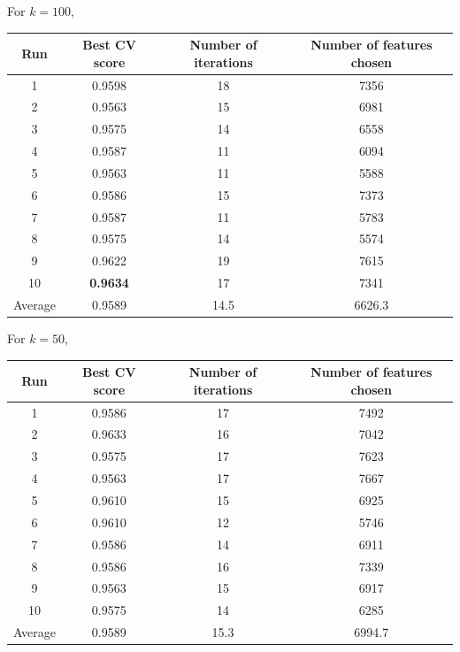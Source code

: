 \documentclass[12pt, twoside, a4paper]{report}
\begin{document}
For $k=100$,
\begin{center}
    \begin{tabular}{| c | c | c | c | } \hline
    Run & Best CV score & Number of iterations & Number of features chosen \\ \hline \hline
    1 & 0.9598 & 18 & 7356 \\ \hline
	2 & 0.9563  & 15 & 6981 \\ \hline
	3 & 0.9575 & 14 & 6558 \\ \hline
	4 & 0.9587 & 11 & 6094 \\ \hline
	5 & 0.9563 & 11 & 5588 \\ \hline
	6 & 0.9586 & 15 & 7373 \\ \hline
	7 & 0.9587 & 11 & 5783 \\ \hline
	8 & 0.9575 & 14 & 5574 \\ \hline
	9 & 0.9622 & 19 & 7615 \\ \hline
	10 & \textbf{0.9634} & 17 & 7341 \\ \hline
	Average & 0.9589 & 14.5 & 6626.3 \\ \hline
    \end{tabular}
\end{center}


For $k=50$,
\begin{center}
    \begin{tabular}{| c | c | c | c | } \hline
    Run & Best CV score & Number of iterations & Number of features chosen \\ \hline \hline
    1 & 0.9586 & 17 & 7492 \\ \hline
	2 & 0.9633 & 16 & 7042 \\ \hline
	3 & 0.9575 & 17 & 7623 \\ \hline
	4 & 0.9563 & 17 & 7667 \\ \hline
	5 & 0.9610 & 15 & 6925 \\ \hline
	6 & 0.9610 & 12 & 5746 \\ \hline
	7 & 0.9586 & 14 & 6911 \\ \hline
	8 & 0.9586 & 16 & 7339 \\ \hline
	9 & 0.9563 & 15 & 6917 \\ \hline
	10 & 0.9575 & 14 & 6285 \\ \hline
	Average & 0.9589 & 15.3 & 6994.7 \\ \hline
    \end{tabular}
\end{center}
\end{document}
